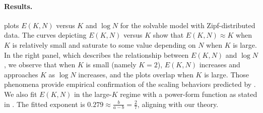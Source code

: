 

\paragraph{Results.}  plots $E(K, N)$ versus $K$ and $\log N$ for the solvable model with Zipf-distributed  data. The curves depicting $E(K,N)$ versus $K$ show that $E(K,N)\approx K$ when $K$ is relatively small and saturate to some value depending on $N$ when $K$ is large. In the right panel, which describes the relationship between $E(K,N)$ and $\log N$, we observe that when $K$ is small (namely $K=2$), $E(K,N)$ increases and approaches $K$ as $\log N$ increases, and the plots overlap when $K$ is large. Those phenomena provide empirical confirmation of the scaling behaviors predicted by . We also fit $E(K,N)$ in the large-$K$ regime with a power-form function as stated in . The fitted exponent is $0.279 \approx \tfrac{b}{a-b} = \tfrac{2}{7}$, aligning with our theory.

